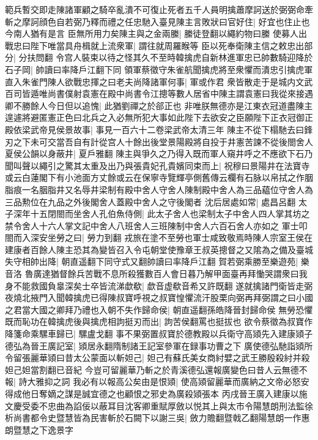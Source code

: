 範兵暫交即走陳諸軍顧之騎卒亂潰不可復止死者五千人員明擒蕭摩訶送於弼弼命牽斬之摩訶顔色自若弼乃釋而禮之任忠馳入臺見陳主言敗狀曰官好住|{
	好宜也住止也今南人猶有是言}
臣無所用力矣陳主與之金兩縢|{
	縢徒登翻以繩約物曰縢}
使募人出戰忠曰陛下唯當具舟楫就上流衆軍|{
	謂往就周羅睺等}
臣以死奉衛陳主信之敕忠出部分|{
	分扶問翻}
令宫人裝束以待之怪其久不至時韓擒虎自新林進軍忠已帥數騎迎降於石子岡|{
	帥讀曰率降戶江翻下同}
領軍蔡徵守朱雀航聞擒虎將至衆懼而潰忠引擒虎軍直入朱雀門陳人欲戰忠揮之曰老夫尚降諸軍何事|{
	軍或作君}
衆皆散走于是城内文武百司皆遁唯尚書僕射袁憲在殿中尚書令江摠等數人居省中陳主謂袁憲曰我從來接遇卿不勝餘人今日但以追愧|{
	此猶劉禪之於郤正也}
非唯朕無德亦是江東衣冠道盡陳主遑遽將避匿憲正色曰北兵之入必無所犯大事如此陛下去欲安之臣願陛下正衣冠御正殿依梁武帝見侯景故事|{
	事見一百六十二卷梁武帝太清三年}
陳主不從下榻馳去曰鋒刃之下未可交當吾自有計從宫人十餘出後堂景陽殿將自投于井憲苦諫不從後閤舍人夏侯公韻以身蔽井|{
	夏戶雅翻}
陳主與爭久之乃得入既而軍人窺井呼之不應欲下石乃聞叫聲以繩引之驚其太重及出乃與張貴妃孔貴嬪同束而上|{
	祝穆曰景陽井在法寶寺或云白蓮閣下有小池面方丈餘或云在保寧寺覽輝亭側舊傳云欄有石脉以帛拭之作胭脂痕一名胭脂井又名辱井梁制有殿中舍人守舍人陳制殿中舍人為三品藴位守舍人為三品勲位在九品之外後閣舍人蓋殿中舍人之守後閣者}
沈后居處如常|{
	處昌呂翻}
太子深年十五閉閤而坐舍人孔伯魚侍側|{
	此太子舍人也梁制太子中舍人四人掌其坊之禁令舍人十六人掌文記中舍人八班舍人三班陳制中舍人六百石舍人亦如之}
軍士叩閤而入深安坐勞之曰|{
	勞力到翻}
戎旅在塗不至勞也軍士咸致敬焉時陳人宗室王侯在建康者百餘人陳主恐其為變皆召入令屯朝堂使豫章王叔英摠督之又隂為之備及臺城失守相帥出降|{
	朝直遥翻下同守式又翻帥讀曰率降戶江翻}
賀若弼乘勝至樂遊苑|{
	樂音洛}
魯廣達猶督餘兵苦戰不息所殺獲數百人會日暮乃解甲面臺再拜慟哭謂衆曰我身不能救國負辠深矣士卒皆流涕歔欷|{
	歔音虚欷音希又許既翻}
遂就擒諸門衛皆走弼夜燒北掖門入聞韓擒虎已得陳叔寶呼視之叔寶惶懼流汗股栗向弼再拜弼謂之曰小國之君當大國之卿拜乃禮也入朝不失作歸命侯|{
	朝直遥翻孫皓降晉封歸命侯}
無勞恐懼既而恥功在韓擒虎後與擒虎相訽挺刃而出|{
	訽苦侯翻罵也挺拔也}
欲令蔡徵為叔寶作降箋命乘騾車歸已|{
	騾盧戈翻}
事不果弼置叔寶於德教殿以兵衛守高熲先入建康熲子德弘為晉王廣記室|{
	熲居永翻隋制諸王記室參軍在録事功曹之下}
廣使德弘馳詣熲所令留張麗華熲曰昔太公蒙面以斬妲己|{
	妲己有蘇氏美女商紂嬖之武王勝殷殺紂并殺妲己妲當割翻已音紀}
今豈可留麗華乃斬之於青溪德弘還報廣變色曰昔人云無德不報|{
	詩大雅抑之詞}
我必有以報高公矣由是恨熲|{
	使高熲留麗華而廣納之文帝必怒安得成他日奪嫡之謀是誠宜德之也顧恨之邪史為廣殺熲張本}
丙戌晉王廣入建康以施文慶受委不忠曲為諂佞以蔽耳目沈客卿重賦厚斂以悦其上與太市令陽慧朗刑法監徐析尚書都令史暨慧皆為民害斬於石闕下以謝三吳|{
	斂力贍翻暨戟乙翻陽慧朗一作惠朗暨慧之下逸景字}
